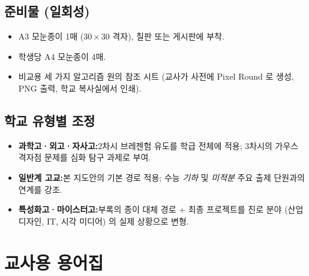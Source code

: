 \documentclass[12pt,a4paper]{scrartcl}
\begin{document}
\subsection{준비물 (일회성)}
\begin{itemize}[leftmargin=1.3em,itemsep=0.1em,topsep=0.2em,nosep]
  \item A3 모눈종이 1매 ($30 \times 30$ 격자), 칠판 또는 게시판에 부착.
  \item 학생당 A4 모눈종이 4매.
  \item 비교용 세 가지 알고리즘 원의 참조 시트 (교사가 사전에 Pixel Round 로 생성, PNG 출력, 학교 복사실에서 인쇄).
\end{itemize}

\subsection{학교 유형별 조정}

\begin{itemize}[leftmargin=1.3em,itemsep=0.15em,topsep=0.3em]
  \item \textbf{과학고·외고·자사고:}2차시 브레젠험 유도를 학급 전체에 적용; 3차시의 가우스 격자점 문제를 심화 탐구 과제로 부여.
  \item \textbf{일반계 고교:}본 지도안의 기본 경로 적용; 수능 \emph{기하} 및 \emph{미적분} 주요 출제 단원과의 연계를 강조.
  \item \textbf{특성화고·마이스터고:}부록의 종이 대체 경로 + 최종 프로젝트를 진로 분야 (산업 디자인, IT, 시각 미디어) 의 실제 상황으로 변형.
\end{itemize}

\newpage
\section{교사용 용어집}\label{ap:glos}
\end{document}

